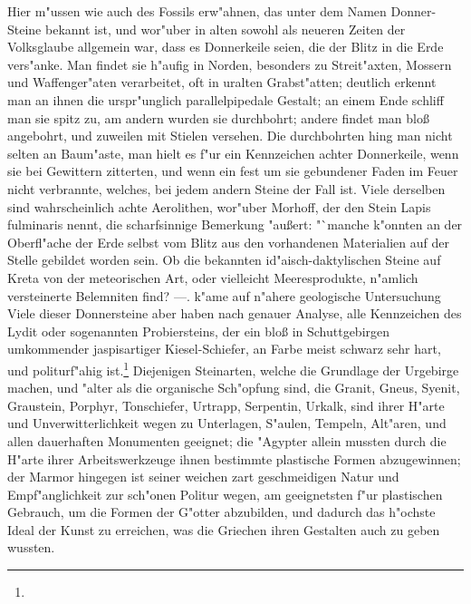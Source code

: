 \documentclass[a4paper, 11pt, oneside, polutonikogreek, german]{article}
\begin{document}
Hier m"ussen wie auch des Fossils erw"ahnen, das unter dem Namen Donner-Steine bekannt ist, und wor"uber in alten sowohl als neueren Zeiten der Volksglaube allgemein war, dass es Donnerkeile seien, die der Blitz in die Erde vers"anke. Man findet sie h"aufig in Norden, besonders zu Streit"axten, Mossern und Waffenger"aten verarbeitet, oft in uralten Grabst"atten; deutlich erkennt man an ihnen die urspr"unglich parallelpipedale Gestalt; an einem Ende schliff man sie spitz zu, am andern wurden sie durchbohrt; andere findet man bloß angebohrt, und zuweilen mit Stielen versehen. Die durchbohrten hing man nicht selten an Baum"aste, man hielt es f"ur ein Kennzeichen achter Donnerkeile, wenn sie bei Gewittern zitterten, und wenn ein fest um sie gebundener Faden im Feuer nicht verbrannte, welches, bei jedem andern Steine der Fall ist. Viele derselben sind wahrscheinlich achte Aerolithen, wor"uber Morhoff, der den Stein Lapis fulminaris nennt, die scharfsinnige Bemerkung "außert: "`manche k"onnten an der Oberfl"ache der Erde selbst vom Blitz aus den vorhandenen Materialien auf der Stelle gebildet worden sein. Ob die bekannten id"aisch-daktylischen Steine auf Kreta von der meteorischen Art, oder vielleicht Meeresprodukte, n"amlich versteinerte Belemniten find? ---. k"ame auf n"ahere geologische Untersuchung Viele dieser Donnersteine aber haben nach genauer Analyse, alle Kennzeichen des Lydit oder sogenannten Probiersteins, der ein bloß in Schuttgebirgen umkommender jaspisartiger Kiesel-Schiefer, an Farbe meist schwarz sehr hart, und politurf"ahig ist.\footnote{} Diejenigen Steinarten, welche die Grundlage der Urgebirge machen, und "alter als die organische Sch"opfung sind, die Granit, Gneus, Syenit, Graustein, Porphyr, Tonschiefer, Urtrapp, Serpentin, Urkalk, sind ihrer H"arte und Unverwitterlichkeit wegen zu Unterlagen, S"aulen, Tempeln, Alt"aren, und allen dauerhaften Monumenten geeignet; die "Agypter allein mussten durch die H"arte ihrer Arbeitswerkzeuge ihnen bestimmte plastische Formen abzugewinnen; der Marmor hingegen ist seiner weichen zart geschmeidigen Natur und Empf"anglichkeit zur sch"onen Politur wegen, am geeignetsten f"ur plastischen Gebrauch, um die Formen der G"otter abzubilden, und dadurch das h"ochste Ideal der Kunst zu erreichen, was die Griechen ihren Gestalten auch zu geben wussten.
\end{document}
